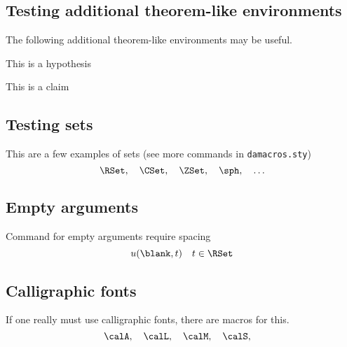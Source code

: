 \documentclass[a4paper]{siamart190516}
\begin{document}
\subsection{Testing additional theorem-like environments} The following additional
theorem-like environments may be useful.

\begin{hypothesis} \label{hyp:trivial}
  This is a hypothesis
\end{hypothesis}

\begin{claim} \label{clm:trivial}
  This is a claim
\end{claim}

\subsection{Testing sets}
This are a few examples of sets (see more commands in \texttt{damacros.sty})
\[
  \RSet, \quad
  \CSet, \quad
  \ZSet, \quad
  \sph, \quad
  \ldots
\]

\subsection{Empty arguments}
Command for empty arguments require spacing
\[
  u(\blank,t) \quad t \in \RSet
\]

\subsection{Calligraphic fonts}
If one really must use calligraphic fonts, there are macros for this.
\[
  \calA, \quad
  \calL, \quad
  \calM, \quad
  \calS, \quad
\]




\end{document}
